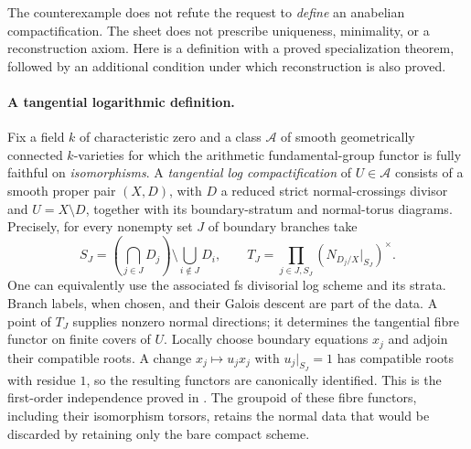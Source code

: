 The counterexample does not refute the request to \emph{define} an anabelian compactification. The sheet does not prescribe uniqueness, minimality, or a reconstruction axiom. Here is a definition with a proved specialization theorem, followed by an additional condition under which reconstruction is also proved.

\paragraph{A tangential logarithmic definition.}
Fix a field $k$ of characteristic zero and a class $\mathcal A$ of smooth geometrically connected $k$-varieties for which the arithmetic fundamental-group functor is fully faithful on \emph{isomorphisms}. A \emph{tangential log compactification} of $U\in\mathcal A$ consists of a smooth proper pair $(X,D)$, with $D$ a reduced strict normal-crossings divisor and $U=X\setminus D$, together with its boundary-stratum and normal-torus diagrams. Precisely, for every nonempty set $J$ of boundary branches take
\[
 S_J=\left(\bigcap_{j\in J}D_j\right)
       \setminus\bigcup_{i\notin J}D_i,\qquad
 T_J=\prod_{j\in J,S_J}
       \left(N_{D_j/X}|_{S_J}\right)^\times .
\]
One can equivalently use the associated fs divisorial log scheme and its strata. Branch labels, when chosen, and their Galois descent are part of the data. A point of $T_J$ supplies nonzero normal directions; it determines the tangential fibre functor on finite covers of $U$. Locally choose boundary equations $x_j$ and adjoin their compatible roots. A change $x_j\mapsto u_jx_j$ with $u_j|_{S_J}=1$ has compatible roots with residue $1$, so the resulting functors are canonically identified. This is the first-order independence proved in \cite[Propositions 1--2 and Remark 1]{HoshiMatsumotoNakayama2026A567}. The groupoid of these fibre functors, including their isomorphism torsors, retains the normal data that would be discarded by retaining only the bare compact scheme.

